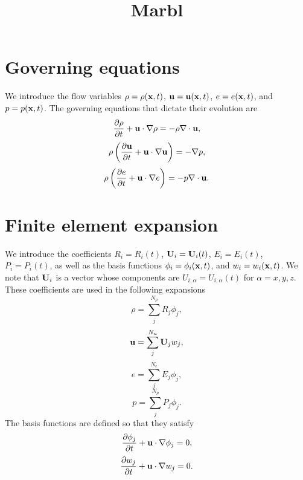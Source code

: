 \documentclass[11pt]{article}
\title{Marbl}
\begin{document}
\maketitle

\section{Governing equations}
We introduce the flow variables $\rho = \rho(\mathbf{x},t)$, $\mathbf{u} = \mathbf{u}(\mathbf{x},t)$, $e = e(\mathbf{x},t)$, and $p = p(\mathbf{x},t)$. The governing equations that dictate their evolution are
\begin{equation}
    \frac{\partial \rho}{\partial t} + \mathbf{u} \cdot \nabla \rho = -\rho \nabla \cdot \mathbf{u},
\end{equation}
\begin{equation}
    \rho \left ( \frac{\partial \mathbf{u}}{\partial t} + \mathbf{u} \cdot \nabla \mathbf{u} \right ) = -\nabla p,
\end{equation}
\begin{equation}
    \rho \left ( \frac{\partial e}{\partial t} + \mathbf{u} \cdot \nabla e \right ) = -p \nabla \cdot \mathbf{u}.
\end{equation}

\section{Finite element expansion}
We introduce the coefficients $R_i = R_i(t)$, $\mathbf{U}_i = \mathbf{U}_i(t)$, $E_i = E_i(t)$, $P_i = P_i(t)$, as well as the basis functions $\phi_i = \phi_i(\mathbf{x},t)$, and $w_i = w_i(\mathbf{x},t)$. We note that $\mathbf{U}_i$ is a vector whose components are $U_{i,\alpha} = U_{i,\alpha}(t)$ for $\alpha = x,y,z$. These coefficients are used in the following expansions
\begin{equation}
    \rho = \sum_j^{N_\rho} R_j \phi_j,
\end{equation}
\begin{equation}
    \mathbf{u} = \sum_j^{N_u} \mathbf{U}_j w_j,
\end{equation}
\begin{equation}
    e = \sum_j^{N_e} E_j \phi_j,
\end{equation}
\begin{equation}
    p = \sum_j^{N_p} P_j \phi_j.
\end{equation}
The basis functions are defined so that they satisfy
\begin{equation}
    \frac{\partial \phi_j}{\partial t} + \mathbf{u} \cdot \nabla \phi_j = 0,
\end{equation}
\begin{equation}
    \frac{\partial w_j}{\partial t} + \mathbf{u} \cdot \nabla w_j = 0.
\end{equation}
\end{document}
